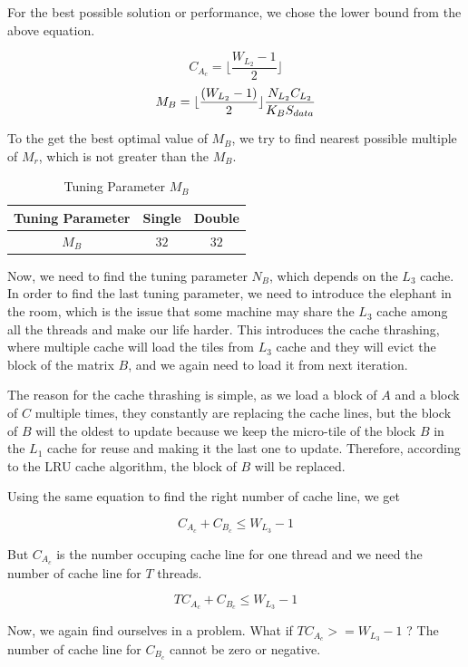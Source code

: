 For the best possible solution or performance, we chose the lower bound from the above equation.

\[
    C_{A_c} = \lfloor \frac{W_{L_2} - 1}{2} \rfloor
\]
\[
    M_B = \lfloor \frac{(W_{L_2} - 1)}{2} \rfloor \frac{N_{L_2} C_{L_2}}{K_B S_{data}}\\
\]

To the get the best optimal value of $M_B$, we try to find nearest possible 
multiple of $M_r$, which is not greater than the $M_B$.

\begin{table}[ht]
    \centering
    \caption{Tuning Parameter $M_B$}
    \begin{tabular}{|c|c|c|}
        \hline
        \textbf{Tuning Parameter} & \textbf{Single} & \textbf{Double}\\
        \hline
        $M_B$   & $32$ & $32$ \\
        \hline
    \end{tabular}
\end{table}

Now, we need to find the tuning parameter $N_B$, which depends on the $L_3$ cache. In order
to find the last tuning parameter, we need to introduce the elephant in the room, which is
the issue that some machine may share the $L_3$ cache among all the threads and make our
life harder. This introduces the cache thrashing, where multiple cache will load the 
tiles from $L_3$ cache and they will evict the block of the matrix $B$, and we again need
to load it from next iteration.

The reason for the cache thrashing is simple, as we load a block of $A$ and a block 
of $C$ multiple times, they constantly are replacing the cache lines, but the block 
of $B$ will the oldest to update because we keep the micro-tile of the block $B$ in 
the $L_1$ cache for reuse and making it the last one to update. 
Therefore, according to the LRU cache algorithm, the block of $B$ will be replaced.

Using the same equation to find the right number of cache line, we get

\[C_{A_c} + C_{B_c} \leq W_{L_3} - 1\]

But $C_{A_c}$ is the number occuping cache line for one thread and we need the number
of cache line for $T$ threads.

\[TC_{A_c} + C_{B_c} \leq W_{L_3} - 1\]

Now, we again find ourselves in a problem. What if $TC_{A_c} >= W_{L_3} - 1$ ? The number of
cache line for $C_{B_c}$ cannot be zero or negative.

